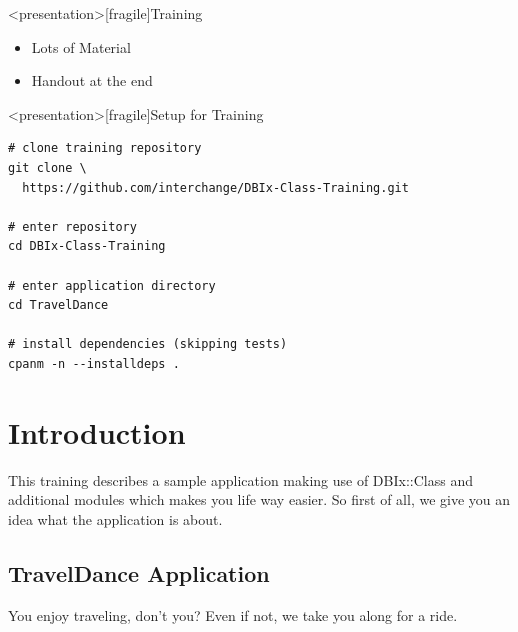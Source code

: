 
\maketitle



\begin{frame}
  \titlepage
\end{frame}

\begin{frame}<presentation>[fragile]{Training}
\begin{itemize}
\item Lots of Material
\item Handout at the end
\end{itemize}
\end{frame}

\begin{frame}<presentation>[fragile]{Setup for Training}
\begin{lstlisting}
# clone training repository
git clone \
  https://github.com/interchange/DBIx-Class-Training.git

# enter repository
cd DBIx-Class-Training

# enter application directory
cd TravelDance

# install dependencies (skipping tests)
cpanm -n --installdeps .
\end{lstlisting}
\end{frame}

\cleardoublepage

\tableofcontents

\cleardoublepage

\section{Introduction}

This training describes a sample application making use of
DBIx::Class and additional modules which makes you life
way easier. So first of all, we give you an idea what
the application is about.

\subsection{TravelDance Application}

You enjoy traveling, don't you? Even if not, we take you
along for a ride.

